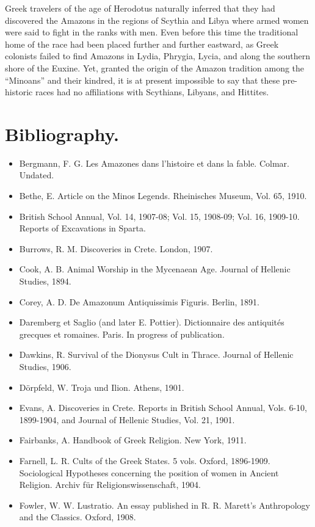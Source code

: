 \documentclass[a4paper, 12pt, oneside]{article}
\begin{document}
Greek travelers of the age of Herodotus naturally inferred that they had discovered the Amazons in the regions of Scythia and Libya where armed women were said to fight in the ranks with men. Even before this time the traditional home of the race had been placed further and further eastward, as Greek colonists failed to find Amazons in Lydia, Phrygia, Lycia, and along the southern shore of the Euxine. Yet, granted the origin of the Amazon tradition among the ``Minoans'' and their kindred, it is at present impossible to say that these pre-historic races had no affiliations with Scythians, Libyans, and Hittites.
\clearpage
\section{Bibliography.}
\begin{itemize}
    \item Bergmann, F. G. Les Amazones dans l'histoire et dans la fable. Colmar. Undated.
    \item Bethe, E. Article on the Minos Legends. Rheinisches Museum, Vol. 65, 1910.
    \item British School Annual, Vol. 14, 1907-08; Vol. 15, 1908-09; Vol. 16, 1909-10. Reports of Excavations in Sparta.
    \item Burrows, R. M. Discoveries in Crete. London, 1907.
    \item Cook, A. B. Animal Worship in the Mycenaean Age. Journal of Hellenic Studies, 1894.
    \item Corey, A. D. De Amazonum Antiquissimis Figuris. Berlin, 1891.
    \item Daremberg et Saglio (and later E. Pottier). Dictionnaire des antiquités grecques et romaines. Paris. In progress of publication.
    \item Dawkins, R. Survival of the Dionysus Cult in Thrace. Journal of Hellenic Studies, 1906.
    \item Dörpfeld, W. Troja und Ilion. Athens, 1901.
    \item Evans, A. Discoveries in Crete. Reports in British School Annual, Vols. 6-10, 1899-1904, and Journal of Hellenic Studies, Vol. 21, 1901.
    \item Fairbanks, A. Handbook of Greek Religion. New York, 1911.
    \item Farnell, L. R. Cults of the Greek States. 5 vols. Oxford, 1896-1909. Sociological Hypotheses concerning the position of women in Ancient Religion. Archiv für Religionswissenschaft, 1904.
    \item Fowler, W. W. Lustratio. An essay published in R. R. Marett's Anthropology and the Classics. Oxford, 1908.

\end{itemize}
\end{document}
